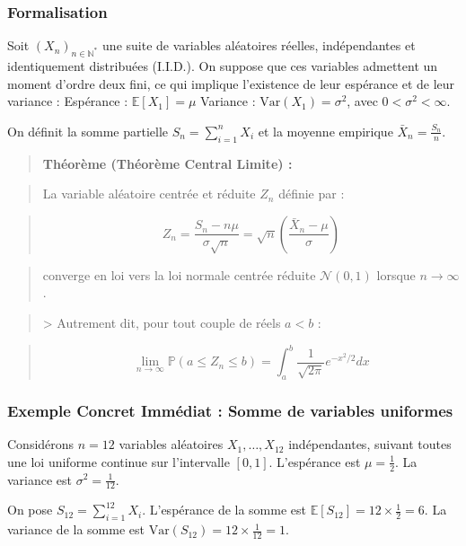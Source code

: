 \documentclass[11pt,a4paper]{article}
\begin{document}
\subsubsection{Formalisation}

Soit $(X_n)_{n \in \mathbb{N}^*}$ une suite de variables aléatoires réelles, indépendantes et identiquement distribuées (I.I.D.). On suppose que ces variables admettent un moment d'ordre deux fini, ce qui implique l'existence de leur espérance et de leur variance :
\textbullet{} Espérance : $\mathbb{E}[X_1] = \mu$
\textbullet{} Variance : $\text{Var}(X_1) = \sigma^2$, avec $0 < \sigma^2 < \infty$.

On définit la somme partielle $S_n = \sum_{i=1}^n X_i$ et la moyenne empirique $\bar{X}_n = \frac{S_n}{n}$.

\begin{quote}\textbf{Théorème (Théorème Central Limite) :}\end{quote}
\begin{quote}La variable aléatoire centrée et réduite $Z_n$ définie par :\end{quote}
\begin{quote}$$Z_n = \frac{S_n - n\mu}{\sigma \sqrt{n}} = \sqrt{n} \left( \frac{\bar{X}_n - \mu}{\sigma} \right)$$\end{quote}
\begin{quote}converge en loi vers la loi normale centrée réduite $\mathcal{N}(0, 1)$ lorsque $n \to \infty$.\end{quote}
\begin{quote}> Autrement dit, pour tout couple de réels $a < b$ :\end{quote}
\begin{quote}$$\lim_{n \to \infty} \mathbb{P}(a \le Z_n \le b) = \int_a^b \frac{1}{\sqrt{2\pi}} e^{-x^2/2} dx$$\end{quote}

\subsubsection{Exemple Concret Immédiat : Somme de variables uniformes}

Considérons $n=12$ variables aléatoires $X_1, \dots, X_{12}$ indépendantes, suivant toutes une loi uniforme continue sur l'intervalle $[0, 1]$.
\textbullet{} L'espérance est $\mu = \frac{1}{2}$.
\textbullet{} La variance est $\sigma^2 = \frac{1}{12}$.

On pose $S_{12} = \sum_{i=1}^{12} X_i$.
L'espérance de la somme est $\mathbb{E}[S_{12}] = 12 \times \frac{1}{2} = 6$.
La variance de la somme est $\text{Var}(S_{12}) = 12 \times \frac{1}{12} = 1$.
\end{document}
